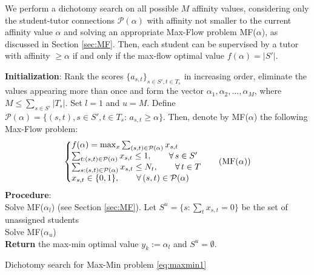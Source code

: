 \documentclass[11pt,oneside,a4paper]{article}     %
\makeatletter
\newenvironment{sistema}%
{\left\lbrace\begin{array}{@{}l@{}}}%
{\end{array}\right.}
\makeatother
\begin{document}
We perform a dichotomy search on all possible $M$ affinity values, considering only the student-tutor connections $\mathcal P(\alpha)$ with affinity not smaller to the current affinity value $\alpha$ and solving an appropriate Max-Flow problem MF($\alpha$), as discussed in Section \ref{sec:MF}. Then, each student can be supervised by a tutor with affinity $\ge \alpha$ if and only if the max-flow optimal value $f(\alpha)=|S'|$.\\



\begin{algorithm}[H]
\textbf{Initialization}: Rank the scores $\{a_{s,t}\}_{s\in S',t\in T_s}$ in increasing order, eliminate the values appearing more than once and form the vector $\alpha_1,\alpha_2,\dots,\alpha_M$, where $M\le \sum_{s\in S'}|T_s|$. Set $l=1$ and $u=M$. Define $\mathcal P(\alpha)=\{(s,t), s\in S',t\in T_s: \, a_{s,t}\ge \alpha\}$. Then, denote by MF($\alpha$) the following Max-Flow problem:
\begin{equation} \label{eq:setcover2}
\begin{sistema}
f(\alpha) = \max_x \sum_{(s,t)\in \mathcal P(\alpha)} x_{s,t} \\
\sum_{t:(s,t)\in \mathcal P(\alpha)} x_{s,t} \le 1, \qquad \forall \, s\in S' \\
\sum_{s:(s,t)\in \mathcal P(\alpha)} x_{s,t} \le N_t, \qquad \forall\, t\in T \\
x_{s,t}\in \{0,1\}, \qquad \forall\, (s,t)\in \mathcal P(\alpha)
\end{sistema} \tag{MF($\alpha$)}
\end{equation}\newline
\textbf{Procedure}: \\
Solve MF($\alpha_l$) (see Section \ref{sec:MF}). Let $S^u=\{s:\sum_t x_{s,t}=0\}$ be the set of unassigned students\\
Solve MF($\alpha_u$)\\
\textbf{Return} the max-min optimal value $y_k:= \alpha_l$ and $S^u=\emptyset$.
\caption{Dichotomy search for Max-Min problem \eqref{eq:maxmin1}}
\label{alg:dichot}
\end{algorithm}
\end{document}
